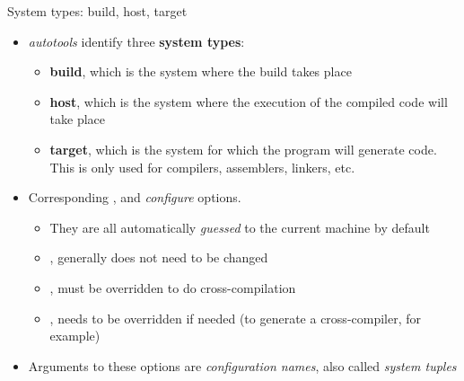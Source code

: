 \begin{frame}{System types: build, host, target}
  \begin{itemize}
  \item {\em autotools} identify three {\bf system types}:
    \begin{itemize}
    \item {\bf build}, which is the system where the build takes place
    \item {\bf host}, which is the system where the execution of the
      compiled code will take place
    \item {\bf target}, which is the system for which the program will
      generate code. This is only used for compilers, assemblers,
      linkers, etc.
    \end{itemize}
  \item Corresponding ,  and
     {\em configure} options.
    \begin{itemize}
    \item They are all automatically {\em guessed} to the current
      machine by default
    \item {}, generally does not need to be changed
    \item {}, must be overridden to do cross-compilation
    \item {}, needs to be overridden if needed (to
      generate a cross-compiler, for example)
    \end{itemize}
  \item Arguments to these options are {\em configuration names}, also
    called {\em system tuples}
  \end{itemize}
\end{frame}

